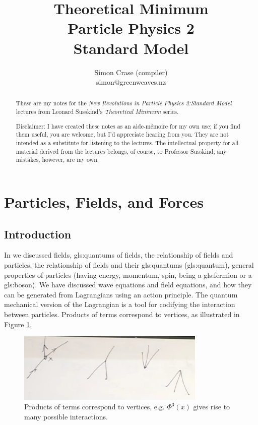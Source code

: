 \documentclass[]{article}
\title{Theoretical Minimum\\Particle Physics 2\\Standard Model}
\author{Simon Crase (compiler)\\simon@greenweaves.nz}
\begin{document}
\maketitle

\begin{abstract}
	These are my notes for the \emph{New Revolutions in Particle Physics 2:Standard Model} lectures from Leonard Susskind's \emph{Theoretical Minimum} series\cite{susskind2007theoretical}.
	
	Disclaimer: I have created these notes as an aide-m\'emoire for my own use; if you find them useful, you are welcome, but I'd appreciate hearing from you. They are not intended as a substitute for listening to the lectures. The intellectual property for all material derived from the lectures belongs, of course, to Professor Susskind; any mistakes, however, are my own.
\end{abstract}

\tableofcontents
\listoffigures
\listoftables
\listoftheorems

\section{Particles, Fields, and Forces}

\subsection{Introduction}

In  \cite[Particle Physics 1: Basic Concepts]{susskind2007theoretical} we discussed fields, \glspl{gls:quantum} of  fields, the relationship of fields and particles, the relationship of fields and their \glspl{gls:quantum} (\glsdesc{gls:quantum}), general properties of particles (having energy, momentum, spin, being a \gls{gls:fermion} or a \gls{gls:boson}). We have discussed wave equations and field equations, and how they can be generated from Lagrangians using an action principle. The quantum mechanical version of  the Lagrangian is a tool for codifying the interaction between particles. Products of terms correspond to vertices, as illustrated in Figure \ref{fig:phi:3:x}.
\begin{figure}[H]
	\caption[Products of terms correspond to vertices]{Products of terms correspond to vertices, e.g. $\Phi^3(x)$ gives rise to many possible interactions.}\label{fig:phi:3:x}
	\includegraphics[width=0.8\textwidth]{phi-3-x}
\end{figure}
\end{document}
